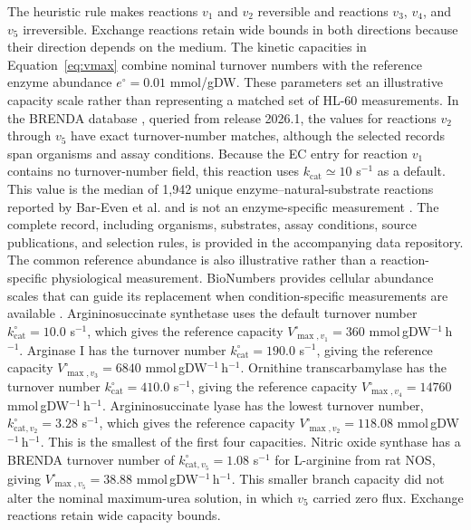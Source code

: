 The heuristic rule makes reactions $v_1$ and $v_2$ reversible and reactions
$v_3$, $v_4$, and $v_5$ irreversible. Exchange reactions retain wide bounds
in both directions because their direction depends on the medium. The
kinetic capacities in Equation~\eqref{eq:vmax} combine nominal turnover
numbers with the reference enzyme abundance $e^{\circ}=0.01$ mmol/gDW. These
parameters set an illustrative capacity scale rather than representing a
matched set of HL-60 measurements. In the BRENDA database
\cite{Chang2021}, queried from release 2026.1,
the values for reactions $v_2$ through $v_5$ have exact turnover-number
matches, although the selected records span organisms and assay conditions.
Because the EC entry for reaction $v_1$ contains no turnover-number field,
this reaction uses $k_{\mathrm{cat}}\simeq10$ s$^{-1}$ as a default. This value
is the median of 1,942 unique enzyme--natural-substrate reactions reported by
Bar-Even et al. and is not an enzyme-specific measurement
\cite{BarEven2011}. The complete record, including organisms, substrates, assay conditions, source
publications, and selection rules, is provided in the accompanying data
repository. The common reference abundance is also illustrative rather than a
reaction-specific physiological measurement. BioNumbers provides cellular
abundance scales that can guide its replacement
when condition-specific measurements are available \cite{Milo2010}.
Argininosuccinate synthetase uses the default turnover number
$k^{\circ}_{\mathrm{cat}}=10.0$ s$^{-1}$, which gives the reference capacity
$V^{\circ}_{\max,v_1}=360$ mmol\,gDW$^{-1}$\,h$^{-1}$. Arginase I has the
turnover number $k^{\circ}_{\mathrm{cat}}=190.0$ s$^{-1}$,
giving the reference capacity
$V^{\circ}_{\max,v_3}=6840$ mmol\,gDW$^{-1}$\,h$^{-1}$. Ornithine
transcarbamylase has the turnover number $k^{\circ}_{\mathrm{cat}}=410.0$
s$^{-1}$, giving the reference capacity
$V^{\circ}_{\max,v_4}=14760$ mmol\,gDW$^{-1}$\,h$^{-1}$. Argininosuccinate
lyase has the lowest turnover number,
$k^{\circ}_{\mathrm{cat},v_2}=3.28$ s$^{-1}$, which gives
the reference capacity $V^{\circ}_{\max,v_2}=118.08$
mmol\,gDW$^{-1}$\,h$^{-1}$. This is the smallest
of the first four capacities. Nitric oxide synthase has a BRENDA turnover
number of $k^{\circ}_{\mathrm{cat},v_5}=1.08$ s$^{-1}$ for L-arginine from
rat NOS, giving $V^{\circ}_{\max,v_5}=38.88$
mmol\,gDW$^{-1}$\,h$^{-1}$. This smaller branch capacity did not alter the
nominal maximum-urea solution, in which $v_5$ carried zero flux. Exchange
reactions retain wide capacity bounds.

